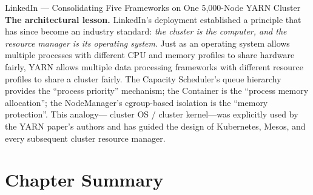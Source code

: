 \begin{casestudy}{LinkedIn --- Consolidating Five Frameworks on One 5{,}000-Node YARN Cluster}
\smallskip
\textbf{The architectural lesson.}
LinkedIn's deployment established a principle that has since become an
industry standard: \emph{the cluster is the computer, and the resource
manager is its operating system}. Just as an operating system allows
multiple processes with different CPU and memory profiles to share
hardware fairly, YARN allows multiple data processing frameworks with
different resource profiles to share a cluster fairly. The Capacity
Scheduler's queue hierarchy provides the ``process priority'' mechanism;
the Container is the ``process memory allocation''; the NodeManager's
cgroup-based isolation is the ``memory protection''. This analogy---
cluster OS / cluster kernel---was explicitly used by the YARN paper's
authors and has guided the design of Kubernetes, Mesos, and every
subsequent cluster resource manager.
\end{casestudy}

\section*{Chapter Summary}
\label{sec:ch5-summary}

